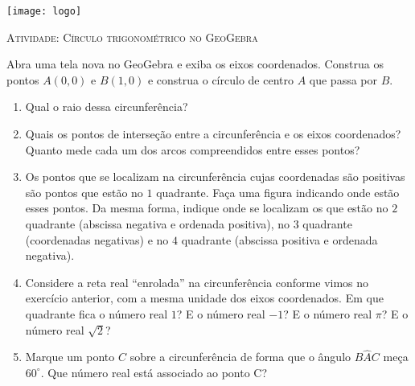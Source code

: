 \documentclass[10 pt,usenames,dvipsnames, oneside]{article}
\begin{document}
\begin{center}
  \begin{minipage}[l]{3cm}
\texttt{[image: logo]}    
\end{minipage}\hfill
\begin{minipage}[r]{.8\textwidth}
 {\Large \scshape Atividade: Círculo trigonométrico no GeoGebra}  
\end{minipage}
\end{center}
\vspace{.2cm}






Abra uma tela nova no GeoGebra e exiba os eixos coordenados. Construa os pontos $A(0,0)$ e $B(1,0)$ e construa o círculo de centro $A$ que passa por $B$.
\begin{enumerate}
\item Qual o raio dessa circunferência?
\item Quais os pontos de interseção entre a circunferência e os eixos coordenados? Quanto mede cada um dos arcos compreendidos entre esses pontos?
\item Os pontos que se localizam na circunferência cujas coordenadas são positivas são pontos que estão no $1$ quadrante. Faça uma figura indicando onde estão esses pontos. Da mesma forma, indique onde se localizam os que estão no $2$ quadrante (abscissa negativa e ordenada positiva), no $3$ quadrante (coordenadas negativas) e no $4$ quadrante (abscissa positiva e ordenada negativa).

\item Considere a reta real “enrolada”{} na circunferência conforme vimos no exercício anterior, com a mesma unidade dos eixos coordenados. Em que quadrante fica o número real $1$? E o número real $-1$? E o número real $\pi$? E o número real $\sqrt{2}$?
\item Marque um ponto $C$ sobre a circunferência de forma que o ângulo $B\hat{A}C$ meça $60^{\circ}$. Que número real está associado ao ponto C?
\end{enumerate}
\end{document}
